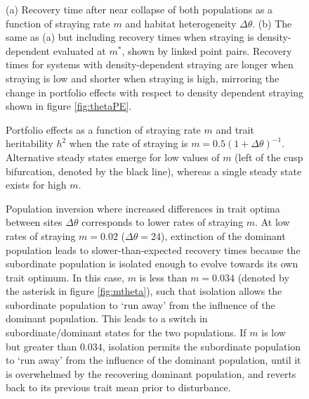 \documentclass{revtex4}
\begin{document}
\begin{figure}
  \captionsetup{justification=raggedright,
singlelinecheck=false
}
\centering
\caption{
(a) Recovery time after near collapse of both populations as a function of straying rate $m$ and habitat heterogeneity $\Delta\theta$.
(b) The same as (a) but including recovery times when straying is density-dependent evaluated at $m^*$, shown by linked point pairs.
Recovery times for systems with density-dependent straying are longer when straying is low and shorter when straying is high, mirroring the change in portfolio effects with respect to density dependent straying shown in figure \ref{fig:thetaPE}.
} \label{fig:relaxtheta}
\end{figure}



\begin{figure}
  \captionsetup{justification=raggedright,
singlelinecheck=false
}
  \centering
  \caption{
  Portfolio effects as a function of straying rate $m$ and trait heritability $h^2$ when the rate of straying is $m = 0.5(1 + \Delta\theta)^{-1}$. Alternative steady states emerge for low values of $m$ (left of the cusp bifurcation, denoted by the black line), whereas a single steady state exists for high $m$.
  } \label{fig:mthetaPE}
\end{figure}


\begin{figure}
  \captionsetup{justification=raggedright,
singlelinecheck=false
}
\centering
\caption{
Population inversion where increased differences in trait optima between sites $\Delta\theta$ corresponds to lower rates of straying $m$.
At low rates of straying $m=0.02$ ($\Delta\theta=24$), extinction of the dominant population leads to slower-than-expected recovery times because the subordinate population is isolated enough to evolve towards its own trait optimum. %
In this case, $m$ is less than $m=0.034$ (denoted by the asterisk in figure \ref{fig:mtheta}), such that isolation allows the subordinate population to `run away' from the influence of the dominant population.
This leads to a switch in subordinate/dominant states for the two populations.
If $m$ is low but greater than $0.034$, isolation permits the subordinate population to `run away' from the influence of the dominant population, until it is overwhelmed by the recovering dominant population, and reverts back to its previous trait mean prior to disturbance.
} \label{fig:inertia}
\end{figure}
\end{document}
